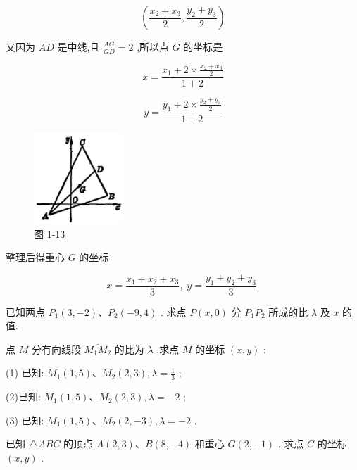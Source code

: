 \documentclass[lang=cn,newtx,10pt,scheme=chinese]{elegantbook}
\begin{document}
\[
  \left( {\frac{{x}_{2} + {x}_{3}}{2},\frac{{y}_{2} + {y}_{3}}{2}}\right)
\]

又因为 \({AD}\) 是中线,且 \(\frac{AG}{GD} = 2\) ,所以点 \(G\) 的坐标是

\[
  x = \frac{{x}_{1} + 2 \times \frac{{x}_{2} + {x}_{3}}{2}}{1 + 2}
\]

\[
  y = \frac{{y}_{1} + 2 \times \frac{{y}_{2} + {y}_{3}}{2}}{1 + 2}
\]

\begin{figure}[h]
  \centering
  \includegraphics[max width=0.3\textwidth]{images/01912cc2-ffb6-728e-9ae7-b113ff05c64b_15_210180.jpg}
  \caption{图 1-13}
\end{figure}



整理后得重心 \(G\) 的坐标

\[
  x = \frac{{x}_{1} + {x}_{2} + {x}_{3}}{3},\;y = \frac{{y}_{1} + {y}_{2} + {y}_{3}}{3}.
\]

\begin{problemset}[练习]

\item 已知两点 \({P}_{1}\left( {3, - 2}\right) \text{、}{P}_{2}\left( {-9,4}\right)\) . 求点 \(P\left( {x,0}\right)\) 分 \(\overline{{P}_{1}{P}_{2}}\) 所成的比 \(\lambda\) 及 \(x\) 的值.

\item 点 \(M\) 分有向线段 \(\overline{{M}_{1}{M}_{2}}\) 的比为 \(\lambda\) ,求点 \(M\) 的坐标 \(\left( {x,y}\right)\) :

(1) 已知: \({M}_{1}\left( {1,5}\right) \text{、}{M}_{2}\left( {2,3}\right) ,\lambda = \frac{1}{3}\) ;

(2)已知: \({M}_{1}\left( {1,5}\right) \text{、}{M}_{2}\left( {2,3}\right) ,\lambda = - 2\) ;

(3) 已知: \({M}_{1}\left( {1,5}\right) \text{、}{M}_{2}\left( {2, - 3}\right) ,\lambda = - 2\) .

\item 已知 \(\bigtriangleup {ABC}\) 的顶点 \(A\left( {2,3}\right) \text{、}B\left( {8, - 4}\right)\) 和重心 \(G\left( {2, - 1}\right)\) . 求点 \(C\) 的坐标 \(\left( {x,y}\right)\) .

\end{problemset}
\end{document}
